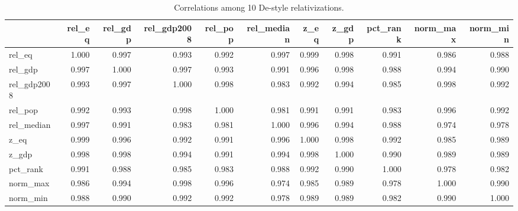 \begin{table}

\caption{\label{tab:tab:de_correlation}Correlations among 10 De-style relativizations.}
\centering
\begin{tabular}[t]{lrrrrrrrrrr}
\toprule
  & rel\_eq & rel\_gdp & rel\_gdp2008 & rel\_pop & rel\_median & z\_eq & z\_gdp & pct\_rank & norm\_max & norm\_min\\
\midrule
rel\_eq & 1.000 & 0.997 & 0.993 & 0.992 & 0.997 & 0.999 & 0.998 & 0.991 & 0.986 & 0.988\\
rel\_gdp & 0.997 & 1.000 & 0.997 & 0.993 & 0.991 & 0.996 & 0.998 & 0.988 & 0.994 & 0.990\\
rel\_gdp2008 & 0.993 & 0.997 & 1.000 & 0.998 & 0.983 & 0.992 & 0.994 & 0.985 & 0.998 & 0.992\\
rel\_pop & 0.992 & 0.993 & 0.998 & 1.000 & 0.981 & 0.991 & 0.991 & 0.983 & 0.996 & 0.992\\
rel\_median & 0.997 & 0.991 & 0.983 & 0.981 & 1.000 & 0.996 & 0.994 & 0.988 & 0.974 & 0.978\\
\addlinespace
z\_eq & 0.999 & 0.996 & 0.992 & 0.991 & 0.996 & 1.000 & 0.998 & 0.992 & 0.985 & 0.989\\
z\_gdp & 0.998 & 0.998 & 0.994 & 0.991 & 0.994 & 0.998 & 1.000 & 0.990 & 0.989 & 0.989\\
pct\_rank & 0.991 & 0.988 & 0.985 & 0.983 & 0.988 & 0.992 & 0.990 & 1.000 & 0.978 & 0.982\\
norm\_max & 0.986 & 0.994 & 0.998 & 0.996 & 0.974 & 0.985 & 0.989 & 0.978 & 1.000 & 0.990\\
norm\_min & 0.988 & 0.990 & 0.992 & 0.992 & 0.978 & 0.989 & 0.989 & 0.982 & 0.990 & 1.000\\
\bottomrule
\end{tabular}
\end{table}
